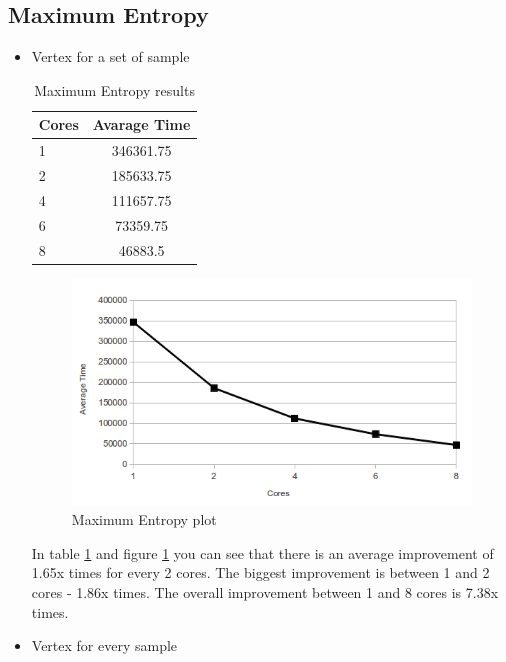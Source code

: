 \documentclass{report}
\begin{document}
\subsection{Maximum Entropy}

\begin{itemize}

\item{Vertex for a set of sample}

\begin{table}[ht]
\centering
\begin{tabular}{ l c }
    \hline\hline
    Cores & Avarage Time \\ [0.2ex]
    \hline
    1 & 346361.75 \\
    2 & 185633.75  \\
    4 &111657.75  \\
    6 & 73359.75  \\
    8 & 46883.5  \\
    \hline
  \end{tabular}
\label{table:maxentres1}
\caption{Maximum Entropy results}
\end{table}

\begin{figure}[!htb]
  \centering
  \includegraphics*[scale=0.70]{maxent_plot.png}
  \caption{Maximum Entropy plot}
  \label{fig:maxent_plot}
\end{figure}

In table \ref{table:maxentres1} and figure \ref{fig:maxent_plot} you can see that there is an average improvement of 1.65x times for every 2 cores. The biggest improvement is between 1 and 2 cores - 1.86x times. The overall improvement between 1 and 8 cores is 7.38x times.

\item{Vertex for every sample}


\end{itemize}
\end{document}
